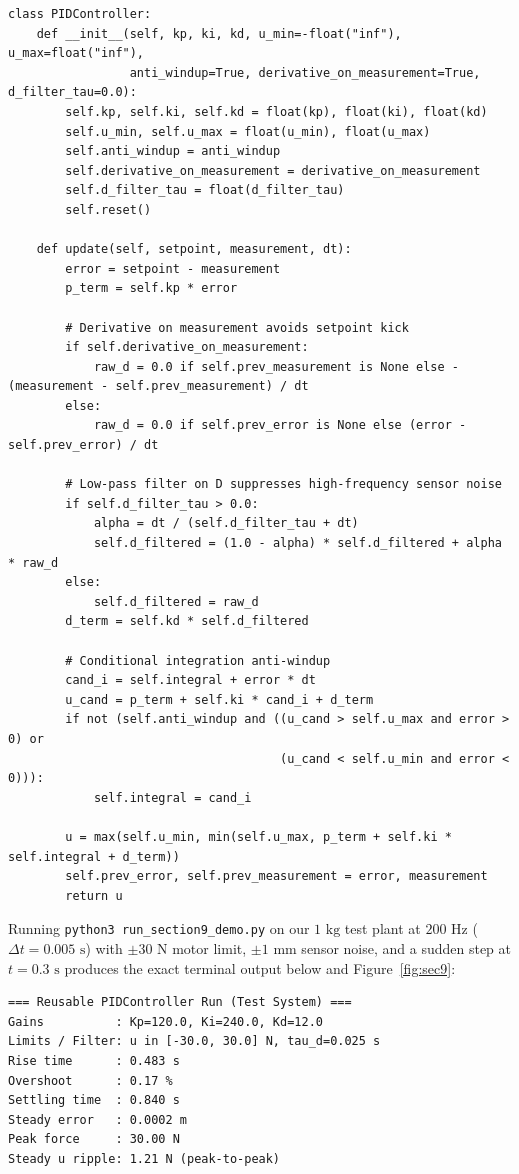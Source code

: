\documentclass[10pt,a4paper]{article}
\begin{document}
\begin{Verbatim}[fontsize=\footnotesize, frame=single, framesep=4pt]
class PIDController:
    def __init__(self, kp, ki, kd, u_min=-float("inf"), u_max=float("inf"),
                 anti_windup=True, derivative_on_measurement=True, d_filter_tau=0.0):
        self.kp, self.ki, self.kd = float(kp), float(ki), float(kd)
        self.u_min, self.u_max = float(u_min), float(u_max)
        self.anti_windup = anti_windup
        self.derivative_on_measurement = derivative_on_measurement
        self.d_filter_tau = float(d_filter_tau)
        self.reset()

    def update(self, setpoint, measurement, dt):
        error = setpoint - measurement
        p_term = self.kp * error

        # Derivative on measurement avoids setpoint kick
        if self.derivative_on_measurement:
            raw_d = 0.0 if self.prev_measurement is None else -(measurement - self.prev_measurement) / dt
        else:
            raw_d = 0.0 if self.prev_error is None else (error - self.prev_error) / dt

        # Low-pass filter on D suppresses high-frequency sensor noise
        if self.d_filter_tau > 0.0:
            alpha = dt / (self.d_filter_tau + dt)
            self.d_filtered = (1.0 - alpha) * self.d_filtered + alpha * raw_d
        else:
            self.d_filtered = raw_d
        d_term = self.kd * self.d_filtered

        # Conditional integration anti-windup
        cand_i = self.integral + error * dt
        u_cand = p_term + self.ki * cand_i + d_term
        if not (self.anti_windup and ((u_cand > self.u_max and error > 0) or
                                      (u_cand < self.u_min and error < 0))):
            self.integral = cand_i

        u = max(self.u_min, min(self.u_max, p_term + self.ki * self.integral + d_term))
        self.prev_error, self.prev_measurement = error, measurement
        return u
\end{Verbatim}

Running \texttt{python3 run\_section9\_demo.py} on our $1\text{ kg}$ test plant at $200\text{ Hz}$ ($\Delta t = 0.005\text{ s}$) with $\pm 30\text{ N}$ motor limit, $\pm 1\text{ mm}$ sensor noise, and a sudden step at $t = 0.3\text{ s}$ produces the exact terminal output below and Figure~\ref{fig:sec9}:
\begin{Verbatim}[fontsize=\footnotesize, frame=single, framesep=4pt]
=== Reusable PIDController Run (Test System) ===
Gains          : Kp=120.0, Ki=240.0, Kd=12.0
Limits / Filter: u in [-30.0, 30.0] N, tau_d=0.025 s
Rise time      : 0.483 s
Overshoot      : 0.17 %
Settling time  : 0.840 s
Steady error   : 0.0002 m
Peak force     : 30.00 N
Steady u ripple: 1.21 N (peak-to-peak)
\end{Verbatim}
\end{document}
